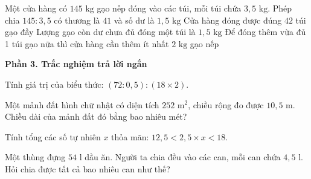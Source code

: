\begin{ex} %
Một cửa hàng có $145\text{ kg}$ gạo nếp đóng vào các túi, mỗi túi chứa $3{,}5\text{ kg}$.
\choiceTF
{\True Phép chia $145 : 3{,}5$ có thương là $41$ và số dư là $1{,}5\text{ kg}$}
{Cửa hàng đóng được đúng $42$ túi gạo đầy}
{\True Lượng gạo còn dư chưa đủ đóng một túi là $1{,}5\text{ kg}$}
{\True Để đóng thêm vừa đủ 1 túi gạo nữa thì cửa hàng cần thêm ít nhất $2\text{ kg}$ gạo nếp}
\end{ex}

\textbf{Phần 3. Trắc nghiệm trả lời ngắn}

\begin{ex} %
Tính giá trị của biểu thức: $(72 : 0{,}5) : (18 \times 2)$.
\end{ex}

\begin{ex} %
Một mảnh đất hình chữ nhật có diện tích $252\text{ m}^2$, chiều rộng đo được $10{,}5\text{ m}$. Chiều dài của mảnh đất đó bằng bao nhiêu mét?
\end{ex}

\begin{ex} %
Tính tổng các số tự nhiên $x$ thỏa mãn: $12{,}5 < 2{,}5 \times x < 18$.
\end{ex}

\begin{ex} %
Một thùng đựng $54\text{ l}$ dầu ăn. Người ta chia đều vào các can, mỗi can chứa $4{,}5\text{ l}$. Hỏi chia được tất cả bao nhiêu can như thế?
\end{ex}

